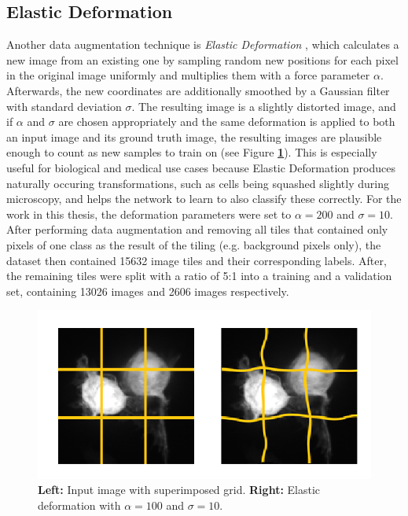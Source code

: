 		\subsection{Elastic Deformation}
Another data augmentation technique is \textit{Elastic Deformation} \cite{elastic}, which calculates a new image from an existing one by sampling random new positions for each pixel in the original image uniformly and multiplies them with a force parameter $\alpha$. Afterwards, the new coordinates are additionally smoothed by a Gaussian filter with standard deviation $\sigma$. The resulting image is a slightly distorted image, and if $\alpha$ and $\sigma$ are chosen appropriately and the same deformation is applied to both an input image and its ground truth image, the resulting images are plausible enough to count as new samples to train on (see Figure \textbf{\ref{fig:elastic}}). This is especially useful for biological and medical use cases because Elastic Deformation produces naturally occuring transformations, such as cells being squashed slightly during microscopy, and helps the network to learn to also classify these correctly. For the work in this thesis, the deformation parameters were set to $\alpha = 200$ and $\sigma = 10$.\\

\noindent After performing data augmentation and removing all tiles that contained only pixels of one class as the result of the tiling (e.g. background pixels only), the dataset then contained 15632 image tiles and their corresponding labels. After, the remaining tiles were split with a ratio of 5:1 into a training and a validation set, containing 13026 images and 2606 images respectively.



\begin {figure}[!ht]
	\begin{center}
		\includegraphics[scale=0.80]{img/fig_elastic.png}
	\end{center}
	\caption[]{\textbf{Left:} Input image with superimposed grid. \textbf{Right:} Elastic deformation with $\alpha = 100$ and $\sigma = 10$.}
	\label{fig:elastic}
\end {figure}


